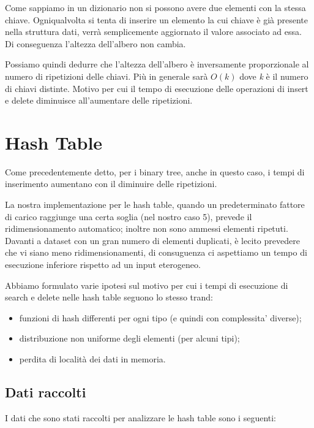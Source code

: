 \documentclass{report}
\begin{document}
Come sappiamo in un dizionario non si possono avere due elementi con la stessa chiave. Ogniqualvolta si tenta di inserire un elemento la cui chiave è già presente nella struttura dati, verrà semplicemente aggiornato il valore associato ad essa. Di conseguenza l'altezza dell'albero non cambia.

Possiamo quindi dedurre che l'altezza dell'albero è inversamente proporzionale al numero di ripetizioni delle chiavi. Più in generale sarà $O(k)$ dove \textit{k} è il numero di chiavi distinte. Motivo per cui il tempo di esecuzione delle operazioni di insert e delete diminuisce all'aumentare delle ripetizioni.

\section{Hash Table}

Come precedentemente detto, per i binary tree, anche in questo caso, i tempi di inserimento aumentano con il diminuire delle ripetizioni.

La nostra implementazione per le hash table, quando un predeterminato fattore di carico raggiunge una certa soglia (nel nostro caso 5), prevede il ridimensionamento automatico; inoltre non sono ammessi elementi ripetuti. Davanti a dataset con un gran numero di elementi duplicati, è lecito prevedere che vi siano meno ridimensionamenti, di consuguenza ci aspettiamo un tempo di esecuzione inferiore rispetto ad un input eterogeneo.

Abbiamo formulato varie ipotesi sul motivo per cui i tempi di esecuzione di search e delete nelle hash table seguono lo stesso trand:

\begin{itemize}
    \item funzioni di hash differenti per ogni tipo (e quindi con complessita' diverse);
    \item distribuzione non uniforme degli elementi (per alcuni tipi);
    \item perdita di località dei dati in memoria.
\end{itemize}

\subsection{Dati raccolti}
I dati che sono stati raccolti per analizzare le hash table sono i seguenti:

\begin{table} [!htb]
\centering
{}
\end{table}
\end{document}
